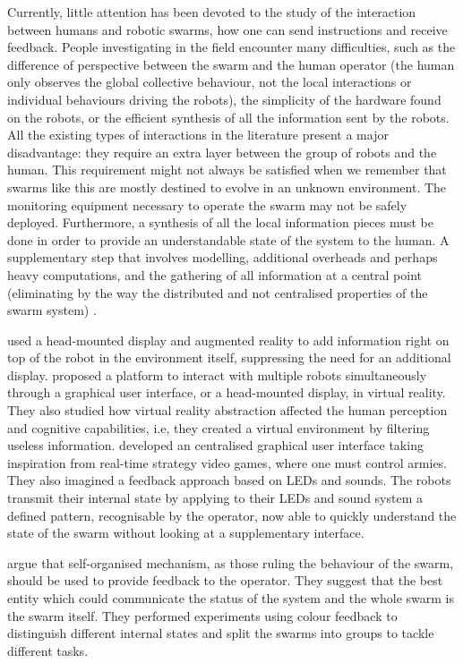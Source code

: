 \documentclass[oneside, a4paper, 12pt]{memoir}
\begin{document}
	Currently, little attention has been devoted to the study of the interaction between humans and robotic swarms, how one can send instructions and receive feedback. People investigating in the field encounter many difficulties, such as the difference of perspective between the swarm and the human operator (the human only observes the global collective behaviour, not the local interactions or individual behaviours driving the robots), the simplicity of the hardware found on the robots, or the efficient synthesis of all the information sent by the robots. All the existing types of interactions in the literature present a major disadvantage: they require an extra layer between the group of robots and the human. This requirement might not always be satisfied when we remember that swarms like this are mostly destined to evolve in an unknown environment. The monitoring equipment necessary to operate the swarm may not be safely deployed. Furthermore, a synthesis of all the local information pieces must be done in order to provide an understandable state of the system to the human. A supplementary step that involves modelling, additional overheads and perhaps heavy computations, and the gathering of all information at a central point (eliminating by the way the distributed and not centralised properties of the swarm system) \citep{podevijn2012self}.
	
	\citet{daily2003world} used a head-mounted display and augmented reality to add information right on top of the robot in the environment itself, suppressing the need for an additional display. \citet{baizid2009human} proposed a platform to interact with multiple robots simultaneously through a graphical user interface, or a head-mounted display, in virtual reality. They also studied how virtual reality abstraction affected the human perception and cognitive capabilities, i.e, they created a virtual environment by filtering useless information. \citet{mclurkin2006speaking} developed an centralised graphical user interface taking inspiration from real-time strategy video games, where one must control armies. They also imagined a feedback approach based on LEDs and sounds. The robots transmit their internal state by applying to their LEDs and sound system a defined pattern, recognisable by the operator, now able to quickly understand the state of the swarm without looking at a supplementary interface.
	
	\citet{podevijn2012self} argue that self-organised mechanism, as those ruling the behaviour of the swarm, should be used to provide feedback to the operator. They suggest that the best entity which could communicate the status of the system and the whole swarm is the swarm itself. They performed experiments using colour feedback to distinguish different internal states and split the swarms into groups to tackle different tasks.
	
\end{document}
